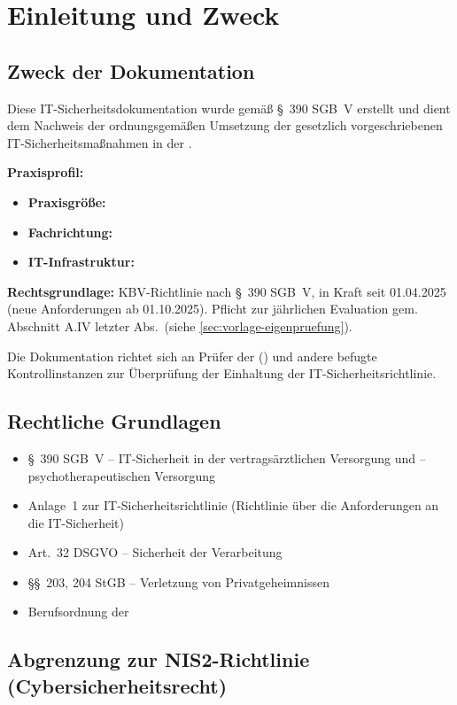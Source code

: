\section{Einleitung und Zweck}

\subsection{Zweck der Dokumentation}

Diese IT-Sicherheitsdokumentation wurde gemäß §~390 SGB~V erstellt und dient dem Nachweis
der ordnungsgemäßen Umsetzung der gesetzlich vorgeschriebenen
IT-Sicher\-heits\-maß\-nah\-men in der \PraxisName.

\textbf{Praxisprofil:}
\begin{itemize}
  \item \textbf{Praxisgröße:} \PraxisGroesse
  \item \textbf{Fachrichtung:} \PraxisFachrichtung
  \item \textbf{IT-Infrastruktur:} \PraxisITInfrastruktur
\end{itemize}

\textbf{Rechtsgrundlage:} KBV-Richtlinie nach §~390 SGB~V, in Kraft seit 01.04.2025
(neue Anforderungen ab 01.10.2025). Pflicht zur jährlichen Evaluation gem. Abschnitt
A.IV letzter Abs.\ (siehe \cref{sec:vorlage-eigenpruefung}).

Die Dokumentation richtet sich an Prüfer der \KVLang{}
(\KV) und andere befugte Kontrollinstanzen zur Überprüfung der Einhaltung der
IT-Sicherheitsrichtlinie.

\subsection{Rechtliche Grundlagen}

\begin{itemize}
  \item \S~390 SGB~V – IT-Sicherheit in der vertragsärztlichen Versorgung und
    –psychotherapeutischen Versorgung
  \item Anlage~1 zur IT-Sicherheitsrichtlinie (Richtlinie über die Anforderungen an die
    IT-Sicherheit)
  \item Art.~32 DSGVO – Sicherheit der Verarbeitung
  \item \S\S~203, 204 StGB – Verletzung von Privatgeheimnissen
  \item Berufsordnung der \KammerLang
\end{itemize}

\subsection{Abgrenzung zur NIS2-Richtlinie (Cybersicherheitsrecht)}


